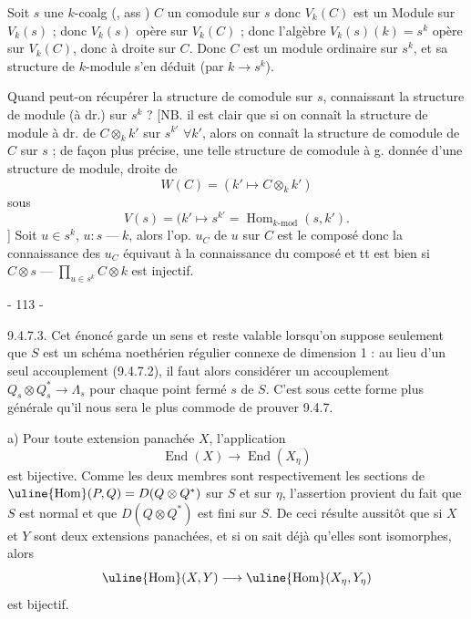 Soit $s$ une $k$-coalg (, ass )
$C$ un comodule  sur $s$
donc $V_k(C)$ est un Module  sur $V_k(s)$ ;  donc  $V_k(s)$ opère  sur $V_k(C)$ ; donc l'algèbre $V_k(s)(k)=s^k$ opère  sur $V_k(C)$, donc à droite sur $C$. Donc $C$ est un module  ordinaire sur $s^k$, et sa structure de $k$-module s'en déduit (par $k\longrightarrow s^k$).

Quand peut-on récupérer la structure de comodule  sur $s$, connaissant la structure de module (à dr.) sur $s^k$ ? [NB. il est clair que si on connaît la structure de module à dr. de $C\otimes_k k'$ sur $s^{k'}$ $\forall k'$, alors on connaît la structure de comodule de $C$ sur $s$ ; de façon plus précise, une telle structure de comodule à g.   donnée d'une structure de module, droite de
\[
W(C)=(k'\longmapsto C\otimes_k k')
\]
sous
\[
V(s)=(k'\longmapsto s^{k'}=\operatorname{Hom}_{k\text{-mod}}(s,k').
\]
] Soit $u\in s^k$, $u:s\mathbin{\text{---}}k$, alors l'op. $u_C$ de $u$ sur $C$ est le composé
donc la connaissance des $u_C$ équivaut à la connaissance du composé
et tt est bien si $C\otimes s\mathbin{\text{---}}\prod_{u\in s^k}C\otimes k$ est injectif.
\begin{center}- 113 -\end{center}

9.4.7.3. Cet énoncé garde un sens et reste valable lorsqu'on suppose seulement que $S$ est un schéma noethérien régulier connexe de dimension 1 : au lieu d'un seul accouplement (9.4.7.2), il faut alors considérer un accouplement $Q_s\otimes Q_s^*\longrightarrow\Lambda_s$ pour chaque point fermé $s$ de $S$. C'est sous cette forme plus générale qu'il nous sera le plus commode de prouver 9.4.7.

a) Pour toute extension panachée $X$, l'application
\[
\operatorname{End}(X)\longrightarrow\operatorname{End}(X_\eta)
\]
est bijective. Comme les deux membres sont respectivement les sections de $\uline{\operatorname{Hom}}(P,Q)=D(Q\otimes Q^*)$ sur $S$ et sur $\eta$, l'assertion provient du fait que $S$ est normal et que $D(Q\otimes Q^*)$ est fini sur $S$. De ceci résulte aussitôt que si $X$ et $Y$ sont deux extensions panachées, et si on sait déjà qu'elles sont isomorphes, alors
\[
\uline{\operatorname{Hom}}(X,Y)\longrightarrow\uline{\operatorname{Hom}}(X_\eta,Y_\eta)
\]
est bijectif.

